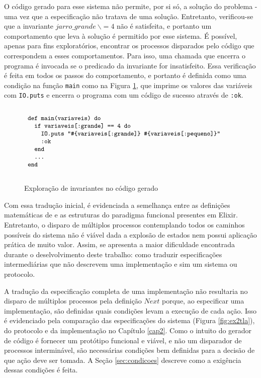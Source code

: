 O código gerado para esse sistema não permite, por si só, a solução do problema - uma vez que a especificação não tratava de uma solução. Entretanto, verificou-se que a invariante $jarro\_grande\ \backslash= 4$ não é satisfeita, e portanto um comportamento que leva à solução é permitido por esse sistema. É possível, apenas para fins exploratórios, encontrar os processos disparados pelo código que correspondem a esses comportamentos. Para isso, uma chamada que encerra o programa é invocada se o predicado da invariante for insatisfeito. Essa verificação é feita em todos os passos do comportamento, e portanto é definida como uma condição na função \texttt{main} como na Figura \ref{fig:invariant-ex1}, que imprime os valores das variáveis com \texttt{IO.puts} e encerra o programa com um código de sucesso através de \texttt{:ok}.

\begin{figure}[h]
  \centering
  $\progfig{
  ~def main(variaveis) do\\
  ~~~if variaveis[:grande] == 4 do\\
  ~~~~~IO.puts "\#\{variaveis[:grande]\} \#\{variaveis[:pequeno]\}"\\
  ~~~~~:ok\\
  ~~~end\\
  ~~~\dots\\
  ~end
  }$
  \caption{Exploração de invariantes no código gerado}
\label{fig:invariant-ex1}
\end{figure}

Com essa tradução inicial, é evidenciada a semelhança entre as definições
matemáticas de \TLA e as estruturas do paradigma funcional presentes em Elixir.
Entretanto, o disparo de múltiplos processos contemplando todos os caminhos
possíveis do sistema não é viável dada a explosão de estados nem possui
aplicação prática de muito valor. Assim, se apresenta a maior dificuldade
encontrada durante o deselvolvimento deste trabalho: como traduzir
especificações intermediárias que não descrevem uma implementação e sim um
sistema ou protocolo.

A tradução da especificação completa de uma implementação não resultaria no
disparo de múltiplos processos pela definição $Next$ porque, ao especificar uma
implementação, são definidas quais condições levam a execução de cada ação. Isso
é evidenciado pela comparação das especificações do sistema (Figura
\ref{fig:ex2tla}), do protocolo e da implementação no Capítulo \ref{cap2}. Como o
intuito do gerador de código é fornecer um protótipo funcional e viável, e não
um disparador de processos interminável, são necessárias condições bem definidas
para a decisão de que ação deve ser tomada. A Seção \ref{sec:condicoes}
descreve como a exigência dessas condições é feita.

